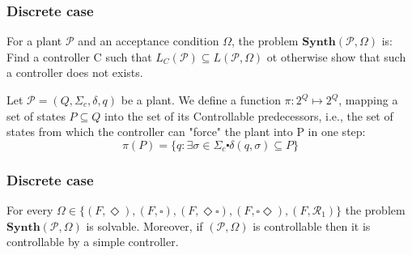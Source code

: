 \documentclass[table]{beamer}
\begin{document}
\begin{frame}
	\frametitle{Discrete case}
	\begin{dfn}
		For a plant $\mathcal{P}$ and an acceptance condition $\Omega$, the problem $\textbf{Synth}(\mathcal{P},\Omega)$ is:
		Find a controller C such that $L_C(\mathcal{P})\subseteq L(\mathcal{P},\Omega)$ ot otherwise show that such
		 a controller does not exists.
	\end{dfn}

	\begin{dfn}
		Let $\mathcal{P}=(Q,\Sigma_c,\delta, q)$ be a plant. We define a function 
		$\pi:2^Q \longmapsto 2^Q$, mapping a set of states $P \subseteq Q$ into the set of its Controllable 
		predecessors, i.e., the set of states from which the controller can "force" the plant into P in one step:
		$$ \pi(P) = \{q : \exists \sigma \in \Sigma_c \centerdot  \delta(q,\sigma) \subseteq P\} $$
	\end{dfn}
\end{frame}

\begin{frame}
	\frametitle{Discrete case}
	\begin{thm}
		For every $\Omega \in \{(F,\Diamond),(F,\square ),(F,\Diamond\square),(F,\square\Diamond),(F,\mathcal{R}_1)\}$
		the problem $\textbf{Synth}(\mathcal{P},\Omega)$ is solvable. Moreover, if $(\mathcal{P},\Omega)$ is controllable then 
		it is controllable by a simple controller.
	\end{thm}
\end{frame}
\end{document}
